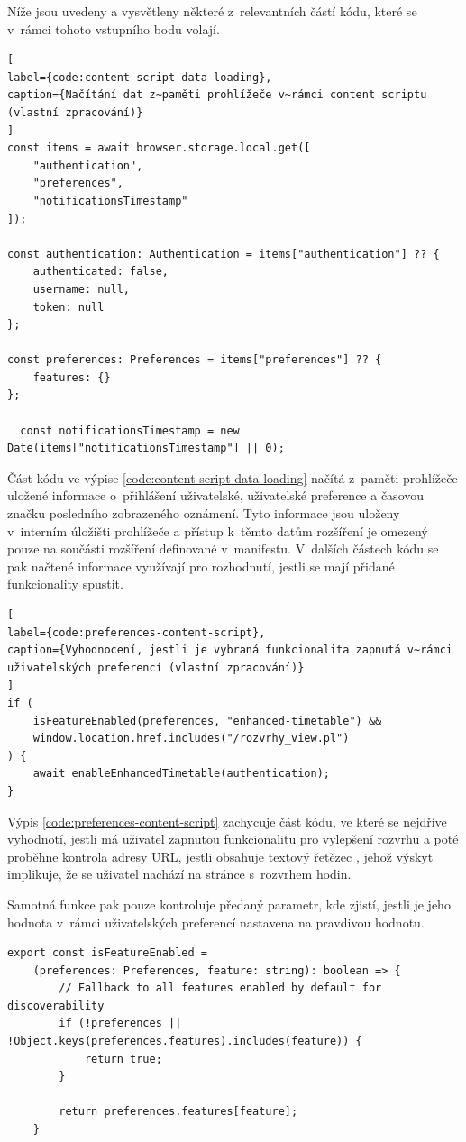 Níže jsou uvedeny a vysvětleny některé z~relevantních částí kódu, které se v~rámci tohoto vstupního bodu volají.

\begin{lstlisting}[
label={code:content-script-data-loading}, 
caption={Načítání dat z~paměti prohlížeče v~rámci content scriptu (vlastní zpracování)}
]
const items = await browser.storage.local.get([
    "authentication",
    "preferences",
    "notificationsTimestamp"
]);

const authentication: Authentication = items["authentication"] ?? {
    authenticated: false,
    username: null,
    token: null
};

const preferences: Preferences = items["preferences"] ?? {
    features: {}
};

  const notificationsTimestamp = new Date(items["notificationsTimestamp"] || 0);
\end{lstlisting}

 Část kódu ve výpise \ref{code:content-script-data-loading} načítá z~paměti prohlížeče uložené informace o~přihlášení uživatelské, uživatelské preference a časovou značku posledního zobrazeného oznámení. Tyto informace jsou uloženy v~interním úložišti prohlížeče a přístup k~těmto datům rozšíření je omezený pouze na součásti rozšíření definované v~manifestu.
V~dalších částech kódu se pak načtené informace využívají pro rozhodnutí, jestli se mají přidané funkcionality spustit.

\begin{lstlisting}[
label={code:preferences-content-script}, 
caption={Vyhodnocení, jestli je vybraná funkcionalita zapnutá v~rámci uživatelských preferencí (vlastní zpracování)}
]
if (
    isFeatureEnabled(preferences, "enhanced-timetable") && 
    window.location.href.includes("/rozvrhy_view.pl")
) {
    await enableEnhancedTimetable(authentication);
}
\end{lstlisting}

Výpis \ref{code:preferences-content-script} zachycuje část kódu, ve které se nejdříve vyhodnotí, jestli má uživatel zapnutou funkcionalitu pro vylepšení rozvrhu a poté proběhne kontrola adresy URL, jestli obsahuje textový řetězec , jehož výskyt implikuje, že se uživatel nachází na stránce s~rozvrhem hodin.

Samotná funkce  pak pouze kontroluje předaný parametr, kde zjistí, jestli je jeho hodnota v~rámci uživatelských preferencí nastavena na pravdivou hodnotu.

\begin{lstlisting}[label={code:is-feature-enabled}, caption={Definice funkce \code{isFeatureEnabled} (vlastní zpracování)}]
export const isFeatureEnabled = 
    (preferences: Preferences, feature: string): boolean => {
        // Fallback to all features enabled by default for discoverability
        if (!preferences ||  !Object.keys(preferences.features).includes(feature)) {
            return true;
        }
    
        return preferences.features[feature];
    }
\end{lstlisting}

